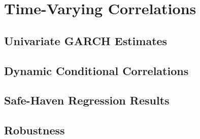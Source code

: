 
\chapter{Time-Varying Correlations}
\label{ch:dcc_garch}



\section{Univariate GARCH Estimates}
\label{sec:dcc_univariate}



\section{Dynamic Conditional Correlations}
\label{sec:dcc_estimates}



\section{Safe-Haven Regression Results}
\label{sec:dcc_safehaven_results}



\section{Robustness}
\label{sec:dcc_robustness}

